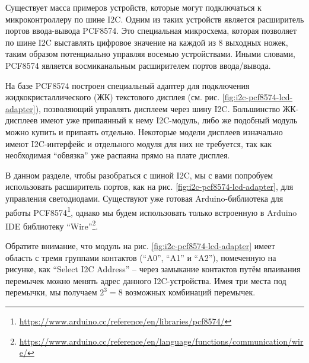 \documentclass[../sparc.tex]{subfiles}
\begin{document}
Существует масса примеров устройств, которые могут подключаться к
микроконтроллеру по шине \gls{I2C}.  Одним из таких устройств является
расширитель портов ввода-вывода PCF8574.  Это специальная микросхема, которая
позволяет по шине I2C выставлять цифровое значение на каждой из 8 выходных
ножек, таким образом потенциально управляя восемью устройствами.  Иными словами,
PCF8574 является восмиканальным расширителем портов ввода/вывода.

На базе PCF8574 построен специальный адаптер для подключения
жидкокристаллического (ЖК) текстового дисплея
(см. рис. \ref{fig:i2c-pcf8574-lcd-adapter}), позволяющий управлять дисплеем
через шину I2C.  Большинство ЖК-дисплеев имеют уже припаянный к нему I2C-модуль,
либо же подобный модуль можно купить и припаять отдельно.  Некоторые модели
дисплеев изначально имеют I2C-интерфейс и отдельного модуля для них не
требуется, так как необходимая ``обвязка'' уже распаяна прямо на плате дисплея.

В данном разделе, чтобы разобраться с шиной I2C, мы с вами попробуем
использовать расширитель портов, как на рис. \ref{fig:i2c-pcf8574-lcd-adapter},
для управления светодиодами.  Существуют уже готовая Arduino-библиотека для
работы
PCF8574\footnote{\url{https://www.arduino.cc/reference/en/libraries/pcf8574/}},
однако мы будем использовать только встроенную в Arduino IDE библиотеку
``Wire''\footnote{\url{https://www.arduino.cc/reference/en/language/functions/communication/wire/}}.

Обратите внимание, что модуль на рис. \ref{fig:i2c-pcf8574-lcd-adapter} имеет
область с тремя группами контактов (``A0'', ``A1'' и ``A2''), помеченную на
рисунке, как ``Select I2C Address'' -- через замыкание контактов путём впаивания
перемычек можно менять адрес данного I2C-устройства.  Имея три места под
перемычки, мы получаем $2^3 = 8$ возможных комбинаций перемычек.
\end{document}
